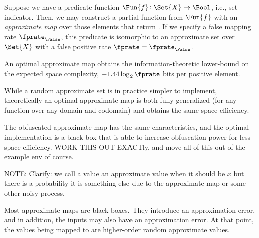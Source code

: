 \documentclass[ ../main.tex]{subfiles}
\begin{document}
\begin{example}
	Suppose we have a predicate function $\Fun{f} \colon \Set{X} \mapsto \Bool$, i.e., set indicator.
	Then, we may construct a partial function from $\Fun{f}$ with an \emph{approximate map} over those elements that return \True.
	If we specify a false mapping rate $\fprate_{\False}$, this predicate is isomorphic to an approximate set over $\Set{X}$ with a false positive rate $\fprate = \fprate_{\False}$.
	
	An optimal approximate map obtains the information-theoretic lower-bound on the expected space complexity, $-1.44 \log_2 \fprate$ bits per positive element.
	
	While a random approximate set is in practice simpler to implement, theoretically an optimal approximate map is both fully generalized (for any function over any domain and codomain) and obtains the same space efficiency.
	
	The obfuscated approximate map has the same characteristics, and the optimal implementation is a black box that is able to increase obfuscation power for less space efficiency.
	WORK THIS OUT EXACTly, and move all of this out of the example env of course.
\end{example}

\begin{remark}
NOTE: Clarify: we call a value an approximate value when it should be $x$ but there is a probability it is something else due to the approximate map or some other noisy process.
\end{remark}

Most approximate maps are black boxes.
They introduce an approximation error, and in addition, the inputs may also have an approximation error. At that point, the values being mapped to are higher-order random approximate values.
\end{document}
